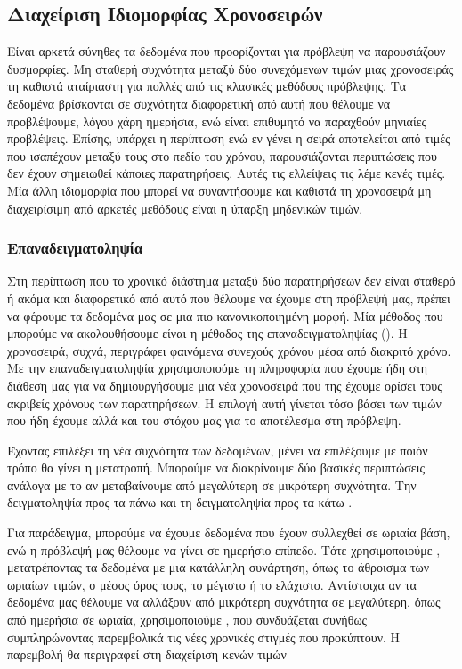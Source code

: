 \subsection{Διαχείριση Ιδιομορφίας Χρονοσειρών}
Είναι αρκετά σύνηθες τα δεδομένα που προορίζονται για πρόβλεψη να παρουσιάζουν δυσμορφίες. Μη σταθερή συχνότητα μεταξύ δύο συνεχόμενων τιμών μιας χρονοσειράς τη καθιστά αταίριαστη για πολλές από τις κλασικές μεθόδους πρόβλεψης. Τα δεδομένα βρίσκονται σε συχνότητα διαφορετική από αυτή που θέλουμε να προβλέψουμε, λόγου χάρη ημερήσια, ενώ είναι επιθυμητό να παραχθούν μηνιαίες προβλέψεις.
Επίσης, υπάρχει η περίπτωση ενώ εν γένει η σειρά αποτελείται από τιμές που ισαπέχουν μεταξύ τους στο πεδίο του χρόνου, παρουσιάζονται περιπτώσεις που δεν έχουν σημειωθεί κάποιες παρατηρήσεις. Αυτές τις ελλείψεις τις λέμε κενές τιμές. Μία άλλη ιδιομορφία που μπορεί να συναντήσουμε και καθιστά τη χρονοσειρά μη διαχειρίσιμη από αρκετές μεθόδους είναι η ύπαρξη μηδενικών τιμών. 

\subsubsection{Επαναδειγματοληψία}
Στη περίπτωση που το χρονικό διάστημα μεταξύ δύο παρατηρήσεων δεν είναι σταθερό ή ακόμα και διαφορετικό από αυτό που θέλουμε να έχουμε στη πρόβλεψή μας, πρέπει να φέρουμε τα δεδομένα μας σε μια πιο κανονικοποιημένη μορφή. Μία μέθοδος που μπορούμε να ακολουθήσουμε είναι η μέθοδος της επαναδειγματοληψίας (). Η χρονοσειρά, συχνά, περιγράφει φαινόμενα συνεχούς χρόνου μέσα από διακριτό χρόνο. Με την επαναδειγματοληψία χρησιμοποιούμε τη πληροφορία που έχουμε ήδη στη διάθεση μας για να δημιουργήσουμε μια νέα χρονοσειρά που της έχουμε ορίσει τους ακριβείς χρόνους των παρατηρήσεων. Η επιλογή αυτή γίνεται τόσο βάσει των τιμών που ήδη έχουμε αλλά και του στόχου μας για το αποτέλεσμα στη πρόβλεψη.

Έχοντας επιλέξει τη νέα συχνότητα των δεδομένων, μένει να επιλέξουμε με ποιόν τρόπο θα γίνει η μετατροπή. Μπορούμε να διακρίνουμε δύο βασικές περιπτώσεις ανάλογα με το αν μεταβαίνουμε από μεγαλύτερη σε μικρότερη συχνότητα. Την δειγματοληψία προς τα πάνω  και τη δειγματοληψία προς τα κάτω .

Για παράδειγμα, μπορούμε να έχουμε δεδομένα που έχουν συλλεχθεί σε ωριαία βάση, ενώ η πρόβλεψή μας θέλουμε να γίνει σε ημερήσιο επίπεδο. Τότε χρησιμοποιούμε , μετατρέποντας τα δεδομένα με μια κατάλληλη συνάρτηση, όπως το άθροισμα των ωριαίων τιμών, ο μέσος όρος τους, το μέγιστο ή το ελάχιστο. Αντίστοιχα αν τα δεδομένα μας θέλουμε να αλλάξουν από μικρότερη συχνότητα σε μεγαλύτερη, όπως από ημερήσια σε ωριαία, χρησιμοποιούμε , που συνδυάζεται συνήθως συμπληρώνοντας παρεμβολικά τις νέες χρονικές στιγμές που προκύπτουν. Η παρεμβολή θα περιγραφεί στη διαχείριση κενών τιμών


